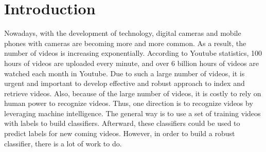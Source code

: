 \section {Introduction}
Nowadays, with the development of technology, digital cameras and mobile phones with cameras are becoming more and more common. As a result, the number of videos is increasing exponentially. According to Youtube statistics, 100 hours of videos are uploaded every minute, and over 6 billion hours of videos are watched each month in Youtube. Due to such a large number of videos, it is urgent and important to develop effective and robust approach to index and retrieve videos. Also, because of the large number of videos, it is costly to rely on human power to recognize videos. Thus, one direction is to recognize videos by leveraging machine intelligence. The general way is to use a set of training videos with labels to build classifiers. Afterward, these classifiers could be used to predict labels for new coming videos. However, in order to build a robust classifier, there is a lot of work to do. \\

